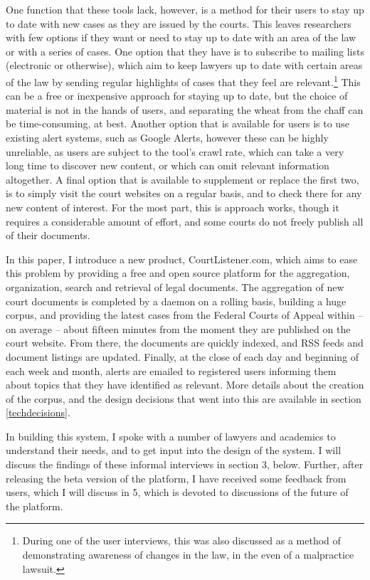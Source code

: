 One function that these tools lack, however, is a method for their users to stay up to date with new cases as they are issued by the courts. This leaves researchers with few options if they want or need to stay up to date with an area of the law or with a series of cases. One option that they have is to subscribe to mailing lists (electronic or otherwise), which aim to keep lawyers up to date with certain areas of the law by sending regular highlights of cases that they feel are relevant.\footnote{During one of the user interviews, this was also discussed as a method of demonstrating awareness of changes in the law, in the even of a malpractice lawsuit.} This can be a free or inexpensive approach for staying up to date, but the choice of material is not in the hands of users, and separating the wheat from the chaff can be time-consuming, at best. Another option that is available for users is to use existing alert systems, such as Google Alerts, however these can be highly unreliable, as users are subject to the tool's crawl rate, which can take a very long time to discover new content, or which can omit relevant information altogether. A final option that is available to supplement or replace the first two, is to simply visit the court websites on a regular basis, and to check there for any new content of interest. For the most part, this is approach works, though it requires a considerable amount of effort, and some courts do not freely publish all of their documents.

In this paper, I introduce a new product, CourtListener.com, which aims to ease this problem by providing a free and open source platform for the aggregation, organization, search and retrieval of legal documents. The aggregation of new court documents is completed by a daemon on a rolling basis, building a huge corpus, and providing the latest cases from the Federal Courts of Appeal within -- on average -- about fifteen minutes from the moment they are published on the court website. From there, the documents are quickly indexed, and RSS feeds and document listings are updated. Finally, at the close of each day and beginning of each week and month, alerts are emailed to registered users informing them about topics that they have identified as relevant. More details about the creation of the corpus, and the design decisions that went into this are available in section \ref{techdecisions}.

In building this system, I spoke with a number of lawyers and academics to understand their needs, and to get input into the design of the system. I will discuss the findings of these informal interviews in section 3, below. Further, after releasing the beta version of the platform, I have received some feedback from users, which I will discuss in 5, which is devoted to discussions of the future of the platform.

